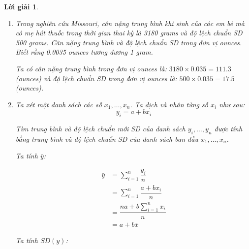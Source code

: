 \documentclass[14pt, a4paper]{article}
\theoremstyle{sltheorem}
\theoremstyle{soltheorem}
\newtheorem*{loigiai}{Lời giải}
\begin{document}
\begin{loigiai}
\begin{enumerate}[wide, labelwidth=!, labelindent=0pt,label=\textbf{\arabic*}.]
        Tuổi của người mẹ hoàn toàn có thể là yếu tố gây nhiễu giữa mối quan hệ giữa người mẹ có hút thuốc trong thời gian thai kỳ hay không và cân nặng khi sinh của em bé.
        Lý do vì tuổi của người mẹ có ảnh hưởng đến cân nặng của em bé, còn phụ nữ lớn tuổi có thể sinh những em bé có cân nặng thấp hơn.
        Mặt khác người mẹ trẻ tuổi có khả năng hút thuốc cao hơn và cũng có thể sinh ra em bé có cân nặng lớn hơn so với người mẹ đã có tuổi khá lớn.
        Điều này hoàn toàn có thể dẫn đến việc người mẹ hút thuốc trong thai kỳ làm có cân nặng em bé khi được sinh lớn hơn so với em bé được sinh bởi người mẹ không hút thuốc trong thai kỳ.

        \item Trong nghiên cứu Missouri, cân nặng trung bình khi sinh của các em bé mà có mẹ hút thuốc trong thời gian thai kỳ là 3180 grams và độ lệch chuẩn SD 500 grams.
        Cân nặng trung bình và độ lệch chuẩn SD trong đơn vị ounces. Biết rằng 0.0035 ounces tương đương 1 gram.

        Ta có cân nặng trung bình trong đơn vị ounces là: $3180\times 0.035=111.3$ (ounces) và độ lệch chuẩn SD trong đơn vị ounces là: $500 \times 0.035=17.5$ (ounces).
        
        \item Ta xét một danh sách các số $x_1, \dots, x_n$. Ta dịch và nhân từng số $x_i$ như sau:
        \begin{equation*}
            y_i = a + b x_i
        \end{equation*}

        Tìm trung bình và độ lệch chuẩn mới SD của danh sách $y_i, \dots, y_n$ được tính bằng trung bình và độ lệch chuẩn SD của danh sách ban đầu $x_1, \dots, x_n$.

        Ta tính $\bar{y}$:

        \begin{equation*}
            \begin{aligned}
                \bar{y} &= \sum_{i=1}^n \dfrac{y_i}{n} \\
                &= \sum_{i=1}^n \dfrac{a + b x_i}{n} \\
                &= \dfrac{na + b \sum_{i=1}^n x_i}{n} \\
                &= a + b \bar{x}
            \end{aligned}    
        \end{equation*}

        Ta tính $SD(y)$:


\end{enumerate}
\end{loigiai}
\end{document}
